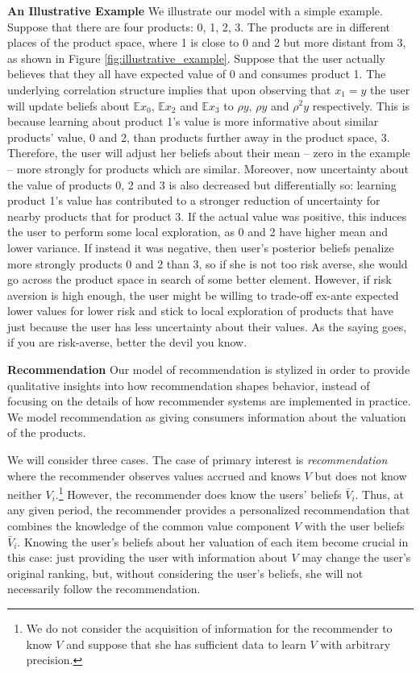 \documentclass[sigconf, anonymous, review]{acmart}
\begin{document}
\noindent \textbf{An Illustrative Example} We illustrate our model with a simple example. Suppose that there are four products: 0, 1, 2, 3. The products are in different places of the product space, where 1 is close to 0 and 2 but more distant from 3, as shown in Figure \ref{fig:illustrative_example}.
Suppose that the user actually believes that they all have expected value of 0 and consumes product 1. The underlying correlation structure implies that upon observing that $x_1=y$ the user will update beliefs about $\mathbb E x_0$, $\mathbb E x_2$ and $\mathbb E x_3$ to $\rho y$, $\rho y$ and $\rho^2 y$ respectively. This is because learning about product 1's value is more informative about similar products' value, 0 and 2, than products further away in the product space, 3. Therefore, the user will adjust her beliefs about their mean -- zero in the example -- more strongly for products which are similar. Moreover, now uncertainty about the value of products 0, 2 and 3 is also decreased but differentially so: learning product 1's value has contributed to a stronger reduction of uncertainty for nearby products that for product 3. If the actual value was positive, this induces the user to perform some local exploration, as 0 and 2 have higher mean and lower variance. If instead it was negative, then user's posterior beliefs penalize more strongly products 0 and 2 than 3, so if she is not too risk averse, she would go across the product space in search of some better element. However, if risk aversion is high enough, the user might be willing to trade-off ex-ante expected lower values for lower risk and stick to local exploration of products that have just because the user has less uncertainty about their values. As the saying goes, if you are risk-averse, better the devil you know.
\par

\noindent \textbf{Recommendation}
Our model of recommendation is stylized in order to provide qualitative insights into how recommendation shapes behavior, instead of focusing on the details of how recommender systems are implemented in practice. We model recommendation as giving consumers information about the valuation of the products.
\par

We will consider three cases. The case of primary interest is \textit{recommendation} where the recommender observes values accrued and knows $V$ but does not know neither $V_i$.\footnote{We do not consider the acquisition of information for the recommender to know $V$ and suppose that she has sufficient data to learn $V$ with arbitrary precision.} However, the recommender does know the users' beliefs $\bar V_i$. Thus, at any given period, the recommender provides a personalized recommendation that combines the knowledge of the common value component $V$ with the user beliefs $\bar V_i$. Knowing the user's beliefs about her valuation of each item become crucial in this case: just providing the user with information about $V$ may change the user's original ranking, but, without considering the user's beliefs, she will not necessarily follow the recommendation.
\par
\end{document}
